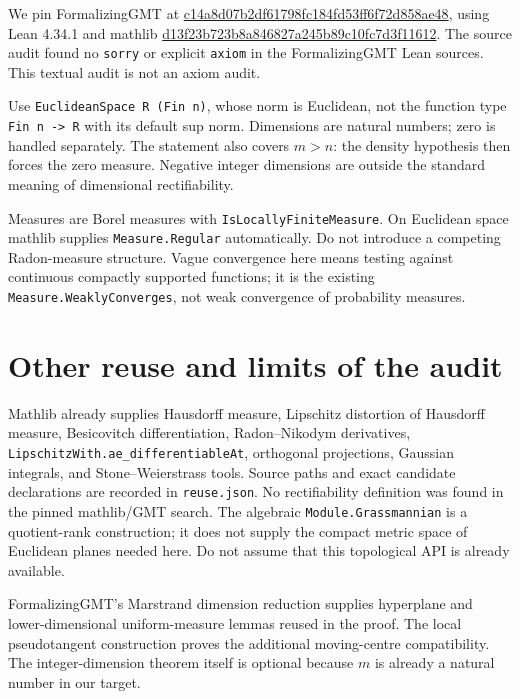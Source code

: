 We pin FormalizingGMT at
\href{https://github.com/uw-math-ai/FormalizingGMT/tree/c14a8d07b2df61798fc184fd53ff6f72d858ae48}{c14a8d07b2df61798fc184fd53ff6f72d858ae48},
using Lean 4.34.1 and mathlib
\href{https://github.com/leanprover-community/mathlib4/tree/d13f23b723b8a846827a245b89c10fc7d3f11612}{d13f23b723b8a846827a245b89c10fc7d3f11612}.
The source audit found no \texttt{sorry} or explicit \texttt{axiom} in the
FormalizingGMT Lean sources. This textual audit is not an axiom audit.

Use \texttt{EuclideanSpace R (Fin n)}, whose norm is Euclidean, not the function
type \texttt{Fin n -> R} with its default sup norm. Dimensions are natural
numbers; zero is handled separately. The statement also covers $m>n$: the
density hypothesis then forces the zero measure. Negative integer dimensions
are outside the standard meaning of dimensional rectifiability.

Measures are Borel measures with \texttt{IsLocallyFiniteMeasure}. On Euclidean
space mathlib supplies \texttt{Measure.Regular} automatically. Do not introduce
a competing Radon-measure structure. Vague convergence here means testing
against continuous compactly supported functions; it is the existing
\texttt{Measure.WeaklyConverges}, not weak convergence of probability measures.

\section{Other reuse and limits of the audit}
Mathlib already supplies Hausdorff measure, Lipschitz distortion of Hausdorff
measure, Besicovitch differentiation, Radon--Nikodym derivatives,
\texttt{LipschitzWith.ae\_differentiableAt}, orthogonal projections,
Gaussian integrals, and Stone--Weierstrass tools. Source paths and exact
candidate declarations are recorded in \texttt{reuse.json}.
No rectifiability definition was found in the pinned mathlib/GMT search.
The algebraic \texttt{Module.Grassmannian} is a quotient-rank construction;
it does not supply the compact metric space of Euclidean planes needed here.
Do not assume that this topological API is already available.

FormalizingGMT's Marstrand dimension reduction supplies hyperplane and
lower-dimensional uniform-measure lemmas reused in the proof. The local
pseudotangent construction proves the additional moving-centre compatibility.
The integer-dimension theorem itself is optional because
$m$ is already a natural number in our target.




